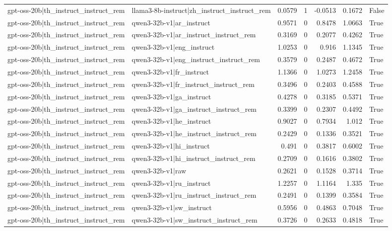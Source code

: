 \begin{table}
\begin{tabular}{l l r r r r l}
gpt-oss-20b|th_instruct_instruct_rem & llama3-8b-instruct|zh_instruct_instruct_rem & 0.0579 & 1 & -0.0513 & 0.1672 & False \\
gpt-oss-20b|th_instruct_instruct_rem & qwen3-32b-v1|ar_instruct & 0.9571 & 0 & 0.8478 & 1.0663 & True \\
gpt-oss-20b|th_instruct_instruct_rem & qwen3-32b-v1|ar_instruct_instruct_rem & 0.3169 & 0 & 0.2077 & 0.4262 & True \\
gpt-oss-20b|th_instruct_instruct_rem & qwen3-32b-v1|eng_instruct & 1.0253 & 0 & 0.916 & 1.1345 & True \\
gpt-oss-20b|th_instruct_instruct_rem & qwen3-32b-v1|eng_instruct_instruct_rem & 0.3579 & 0 & 0.2487 & 0.4672 & True \\
gpt-oss-20b|th_instruct_instruct_rem & qwen3-32b-v1|fr_instruct & 1.1366 & 0 & 1.0273 & 1.2458 & True \\
gpt-oss-20b|th_instruct_instruct_rem & qwen3-32b-v1|fr_instruct_instruct_rem & 0.3496 & 0 & 0.2403 & 0.4588 & True \\
gpt-oss-20b|th_instruct_instruct_rem & qwen3-32b-v1|ga_instruct & 0.4278 & 0 & 0.3185 & 0.5371 & True \\
gpt-oss-20b|th_instruct_instruct_rem & qwen3-32b-v1|ga_instruct_instruct_rem & 0.3399 & 0 & 0.2307 & 0.4492 & True \\
gpt-oss-20b|th_instruct_instruct_rem & qwen3-32b-v1|he_instruct & 0.9027 & 0 & 0.7934 & 1.012 & True \\
gpt-oss-20b|th_instruct_instruct_rem & qwen3-32b-v1|he_instruct_instruct_rem & 0.2429 & 0 & 0.1336 & 0.3521 & True \\
gpt-oss-20b|th_instruct_instruct_rem & qwen3-32b-v1|hi_instruct & 0.491 & 0 & 0.3817 & 0.6002 & True \\
gpt-oss-20b|th_instruct_instruct_rem & qwen3-32b-v1|hi_instruct_instruct_rem & 0.2709 & 0 & 0.1616 & 0.3802 & True \\
gpt-oss-20b|th_instruct_instruct_rem & qwen3-32b-v1|raw & 0.2621 & 0 & 0.1528 & 0.3714 & True \\
gpt-oss-20b|th_instruct_instruct_rem & qwen3-32b-v1|ru_instruct & 1.2257 & 0 & 1.1164 & 1.335 & True \\
gpt-oss-20b|th_instruct_instruct_rem & qwen3-32b-v1|ru_instruct_instruct_rem & 0.2491 & 0 & 0.1399 & 0.3584 & True \\
gpt-oss-20b|th_instruct_instruct_rem & qwen3-32b-v1|sw_instruct & 0.5956 & 0 & 0.4863 & 0.7048 & True \\
gpt-oss-20b|th_instruct_instruct_rem & qwen3-32b-v1|sw_instruct_instruct_rem & 0.3726 & 0 & 0.2633 & 0.4818 & True \\

\end{tabular}
\end{table}
